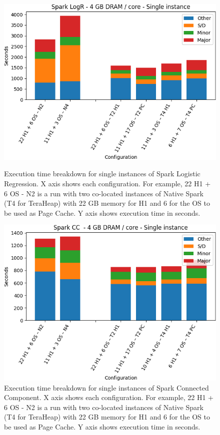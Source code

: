 \begin{figure}[thbp]
        \centering
    \includegraphics[width=\linewidth]{./fig/logr64_single.png}
    \caption{Execution time breakdown for single instances of Spark
    Logistic Regression. X axis shows each configuration.
        For example, 22 H1 + 6 OS - N2 is a run with two co-located instances of Native Spark (T4 for TeraHeap) with 22 GB memory for H1 and 6 for the OS to be used as Page Cache. Y axis shows execution time in seconds.}
    \label{fig:logr64_single}

    \includegraphics[width=\linewidth]{./fig/cc64_single.png}
    \caption{Execution time breakdown for single instances of Spark
    Connected Component. X axis shows each configuration.
        For example, 22 H1 + 6 OS - N2 is a run with two co-located instances of Native Spark (T4 for TeraHeap) with 22 GB memory for H1 and 6 for the OS to be used as Page Cache. Y axis shows execution time in seconds.}
    \label{fig:cc64_single}
\end{figure}

